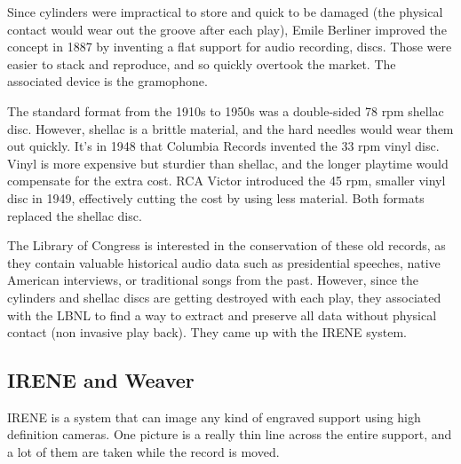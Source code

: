 \documentclass[12pt, twoside]{article}
\begin{document}
Since cylinders were impractical to store and quick to be damaged (the physical contact would wear out the groove after each play), Emile Berliner improved the concept in 1887 by inventing a flat support for audio recording, discs. Those were easier to stack and reproduce, and so quickly overtook the market. The associated device is the gramophone.

The standard format from the 1910s to 1950s was a double-sided 78 rpm shellac disc. However, shellac is a brittle material, and the hard needles would wear them out quickly. It's in 1948 that Columbia Records invented the 33 rpm vinyl disc. Vinyl is more expensive but sturdier than shellac, and the longer playtime would compensate for the extra cost. RCA Victor introduced the 45 rpm, smaller vinyl disc in 1949, effectively cutting the cost by using less material. Both formats replaced the shellac disc.

The Library of Congress is interested in the conservation of these old records, as they contain valuable historical audio data such as presidential speeches, native American interviews, or traditional songs from the past. However, since the cylinders and shellac discs are getting destroyed with each play, they associated with the LBNL to find a way to extract and preserve all data without physical contact (non invasive play back). They came up with the IRENE system.
\subsection{IRENE and Weaver}
IRENE is a system that can image any kind of engraved support using high definition cameras. One picture is a really thin line across the entire support, and a lot of them are taken while the record is moved.
\end{document}
